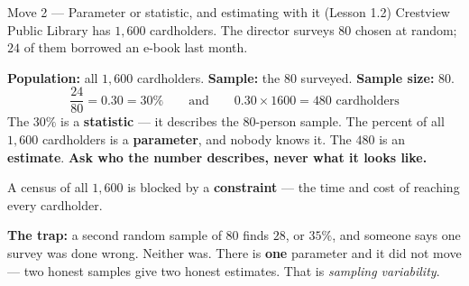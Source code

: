 \documentclass[10pt]{article}
\begin{document}
\vspace{3pt}
\boxguard[14]
\begin{notesbox}{Move 2 --- Parameter or statistic, and estimating with it (Lesson 1.2)}
\small
Crestview Public Library has $1{,}600$ cardholders. The director surveys $80$ chosen at
random; $24$ of them borrowed an e-book last month.

\vspace{2pt}
\textbf{Population:} all $1{,}600$ cardholders. \quad \textbf{Sample:} the $80$ surveyed.
\quad \textbf{Sample size:} $80$.
\[ \frac{24}{80} = 0.30 = 30\% \qquad\text{and}\qquad 0.30 \times 1600 = 480 \text{ cardholders} \]
The $30\%$ is a \textbf{statistic} --- it describes the $80$-person sample. The percent of all
$1{,}600$ cardholders is a \textbf{parameter}, and nobody knows it. The $480$ is an
\textbf{estimate}. \textbf{Ask who the number describes, never what it looks like.}

\vspace{2pt}
A census of all $1{,}600$ is blocked by a \textbf{constraint} --- the time and cost of
reaching every cardholder.

\vspace{2pt}
\textbf{The trap:} a second random sample of $80$ finds $28$, or $35\%$, and someone says one
survey was done wrong. Neither was. There is \textbf{one} parameter and it did not move ---
two honest samples give two honest estimates. That is \emph{sampling variability}.
\end{notesbox}
\end{document}
